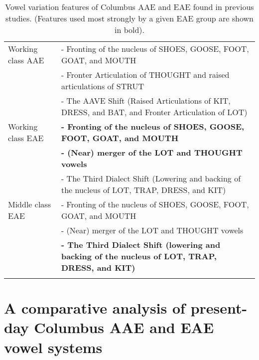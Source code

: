 \documentclass[output=paper,colorlinks,citecolor=brown]{langscibook}
\begin{document}
\begin{table}
\small
\begin{tabularx}{\textwidth}{lX}

\lsptoprule

Working class AAE & - Fronting of the nucleus of SHOES, GOOSE, FOOT, GOAT, and MOUTH \\
\tablevspace

& - Fronter Articulation of THOUGHT and raised articulations of STRUT\\
\tablevspace

& - The AAVE Shift (Raised Articulations of KIT, DRESS, and BAT, and Fronter Articulation of LOT) \\
\tablevspace

\midrule
Working class EAE & \textbf{- Fronting of the nucleus of SHOES, GOOSE, FOOT, GOAT, and MOUTH}\\
\tablevspace

&\textbf{- (Near) merger of the LOT and THOUGHT vowels}\\
\tablevspace

& - The Third Dialect Shift (Lowering and backing of the nucleus of LOT, TRAP, DRESS, and KIT)\\
\tablevspace

\midrule
Middle class EAE & - Fronting of the nucleus of SHOES, GOOSE, FOOT, GOAT, and MOUTH\\

& - (Near) merger of the LOT and THOUGHT vowels\\
\tablevspace

& \textbf{- The Third Dialect Shift (lowering and backing of the nucleus of LOT, TRAP, DRESS, and KIT)}\\
\lspbottomrule
\end{tabularx}
\caption{Vowel variation features of Columbus AAE and EAE found in previous studies. (Features used most strongly by a given EAE group are shown in bold).}
\label{tab:durian:2}
\end{table}



\section{A comparative analysis of present-day Columbus AAE and EAE vowel systems} \label{sec :durian:4}
\end{document}
